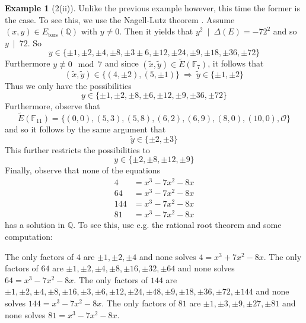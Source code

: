 \documentclass{scrartcl}
\newcommand{\F}{\mathbb{F}}
\newcommand{\Q}{\mathbb{Q}}
\renewcommand{\O}{\mathcal{O}}
\newcommand{\divides}{\ \mid \ }
\theoremstyle{definition}
\newtheorem{example}[subsection]{Example}
\begin{document}
\begin{example}[2(ii)]
    Unlike the previous example however, this time the former is the case.
    To see this, we use the Nagell-Lutz theorem \cite[5.4]{lecture}.
    Assume $(x, y) \in E_{\mathrm{tors}}(\Q)$ with $y \neq 0$.
    Then it yields that $y^2 \divides \Delta(E) = -72^2$ and so $y \divides 72$.
    So
    \begin{equation*}
        y \in \{ \pm 1, \pm 2, \pm 4, \pm 8, \pm 3 \pm 6, \pm 12, \pm 24, \pm 9, \pm 18, \pm 36, \pm 72 \}
    \end{equation*}
    Furthermore $y \not\equiv 0 \mod 7$ and since $(\tilde{x}, \tilde{y}) \in \tilde{E}(\F_7)$, it follows that
    \begin{equation*}
        (\tilde{x}, \tilde{y}) \in \{ (4, \pm 2), (5, \pm 1) \} \ \Rightarrow \ \tilde{y} \in \{ \pm 1, \pm 2 \}
    \end{equation*}
    Thus we only have the possibilities
    \begin{equation*}
        y \in \{ \pm 1, \pm 2, \pm 8, \pm 6, \pm 12, \pm 9, \pm 36, \pm 72 \}
    \end{equation*}
    Furthermore, observe that
    \begin{equation*}
        \tilde{E}(\F_{11}) = \{ (0, 0), (5, 3), (5, 8), (6, 2), (6, 9), (8, 0), (10, 0), \O \}
    \end{equation*}
    and so it follows by the same argument that
    \begin{equation*}
        \tilde{y} \in \{ \pm 2, \pm 3 \}
    \end{equation*}
    This further restricts the possibilities to
    \begin{equation*}
        y \in \{ \pm 2, \pm 8, \pm 12, \pm 9 \}
    \end{equation*}
    Finally, observe that none of the equations
    \begin{align*}
        4 &= x^3 - 7x^2 - 8x \\
        64 &= x^3 - 7x^2 - 8x \\
        144 &= x^3 - 7x^2 - 8x \\
        81 &= x^3 - 7x^2 - 8x
    \end{align*}
    has a solution in $\Q$.
    To see this, use e.g. the rational root theorem and some computation:

    The only factors of $4$ are $\pm 1, \pm 2, \pm 4$ and none solves $4 = x^3 + 7x^2 - 8x$.
    The only factors of $64$ are $\pm 1, \pm 2, \pm 4, \pm 8, \pm 16, \pm 32, \pm 64$ and none solves $64 = x^3 - 7x^2 - 8x$.
    The only factors of $144$ are $\pm 1, \pm 2, \pm 4, \pm 8, \pm 16, \pm 3, \pm 6, \pm 12, \pm 24, \pm 48, \pm 9, \pm 18, \pm 36, \pm 72, \pm 144$ and none solves $144 = x^3 - 7x^2 - 8x$.
    The only factors of $81$ are $\pm 1, \pm 3, \pm 9, \pm 27, \pm 81$ and none solves $81 = x^3 - 7x^2 - 8x$.
\end{example}
\end{document}
